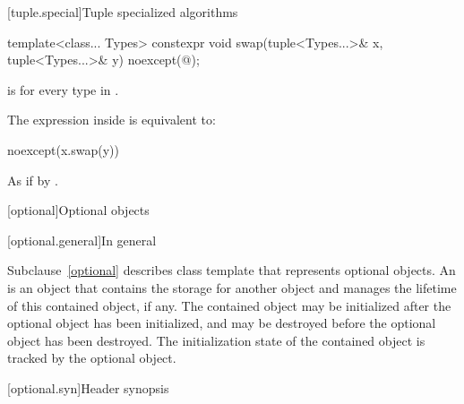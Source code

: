 [tuple.special]{Tuple specialized algorithms}

%
\begin{itemdecl}
template<class... Types>
  constexpr void swap(tuple<Types...>& x, tuple<Types...>& y) noexcept(@\seebelow@);
\end{itemdecl}

\begin{itemdescr}
\pnum
\constraints
{} is 
for every type  in .

\pnum
\remarks
The expression inside  is equivalent to:

\begin{codeblock}
noexcept(x.swap(y))
\end{codeblock}

\pnum
\effects
As if by .
\end{itemdescr}

[optional]{Optional objects}

[optional.general]{In general}

\pnum
Subclause~\ref{optional} describes class template  that represents
optional objects.
An  is an
object that contains the storage for another object and manages the lifetime of
this contained object, if any. The contained object may be initialized after
the optional object has been initialized, and may be destroyed before the
optional object has been destroyed. The initialization state of the contained
object is tracked by the optional object.

[optional.syn]{Header  synopsis}

